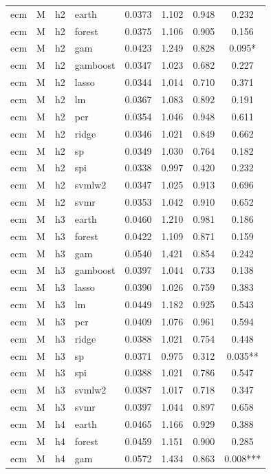 \begin{ThreePartTable}
\begin{longtable}[t]{llclcccc}
\addlinespace
ecm & M & h2 & earth & 0.0373 & 1.102 & 0.948 & 0.232\\
ecm & M & h2 & forest & 0.0375 & 1.106 & 0.905 & 0.156\\
ecm & M & h2 & gam & 0.0423 & 1.249 & 0.828 & 0.095*\\
ecm & M & h2 & gamboost & 0.0347 & 1.023 & 0.682 & 0.227\\
ecm & M & h2 & lasso & 0.0344 & 1.014 & 0.710 & 0.371\\
ecm & M & h2 & lm & 0.0367 & 1.083 & 0.892 & 0.191\\
ecm & M & h2 & pcr & 0.0354 & 1.046 & 0.948 & 0.611\\
ecm & M & h2 & ridge & 0.0346 & 1.021 & 0.849 & 0.662\\
ecm & M & h2 & sp & 0.0349 & 1.030 & 0.764 & 0.182\\
ecm & M & h2 & spi & 0.0338 & 0.997 & 0.420 & 0.232\\
ecm & M & h2 & svmlw2 & 0.0347 & 1.025 & 0.913 & 0.696\\
ecm & M & h2 & svmr & 0.0353 & 1.042 & 0.910 & 0.652\\
\addlinespace
ecm & M & h3 & earth & 0.0460 & 1.210 & 0.981 & 0.186\\
ecm & M & h3 & forest & 0.0422 & 1.109 & 0.871 & 0.159\\
ecm & M & h3 & gam & 0.0540 & 1.421 & 0.854 & 0.242\\
ecm & M & h3 & gamboost & 0.0397 & 1.044 & 0.733 & 0.138\\
ecm & M & h3 & lasso & 0.0390 & 1.026 & 0.759 & 0.383\\
ecm & M & h3 & lm & 0.0449 & 1.182 & 0.925 & 0.543\\
ecm & M & h3 & pcr & 0.0409 & 1.076 & 0.961 & 0.594\\
ecm & M & h3 & ridge & 0.0388 & 1.021 & 0.754 & 0.448\\
ecm & M & h3 & sp & 0.0371 & 0.975 & 0.312 & 0.035**\\
ecm & M & h3 & spi & 0.0388 & 1.021 & 0.786 & 0.547\\
ecm & M & h3 & svmlw2 & 0.0387 & 1.017 & 0.718 & 0.347\\
ecm & M & h3 & svmr & 0.0397 & 1.044 & 0.897 & 0.658\\
\addlinespace
ecm & M & h4 & earth & 0.0465 & 1.166 & 0.929 & 0.388\\
ecm & M & h4 & forest & 0.0459 & 1.151 & 0.900 & 0.285\\
ecm & M & h4 & gam & 0.0572 & 1.434 & 0.863 & 0.008***\\

\end{longtable}
\end{ThreePartTable}

